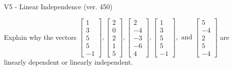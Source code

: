 \begin{exercise}
  \begin{exerciseTitle}V5 - Linear Independence (ver. 450)\end{exerciseTitle}
  \begin{exerciseStatement}
    Explain why the vectors \(\left[\begin{array}{r}
1 \\
3 \\
5 \\
5 \\
-1
\end{array}\right] , \left[\begin{array}{r}
2 \\
0 \\
2 \\
1 \\
5
\end{array}\right] , \left[\begin{array}{r}
2 \\
-4 \\
-3 \\
-6 \\
4
\end{array}\right] , \left[\begin{array}{r}
1 \\
3 \\
5 \\
5 \\
-1
\end{array}\right] , \text{ and } \left[\begin{array}{r}
5 \\
-4 \\
2 \\
5 \\
-4
\end{array}\right]\) are linearly dependent or linearly independent.	



\end{exerciseStatement}
\end{exercise}
